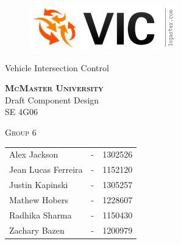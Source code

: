 \documentclass [10pt]{article}
\begin{document}
\begin {center} 

\thispagestyle{empty}
\vspace*{5cm}

\begin {figure}[h!]
\centering
\hspace{-10mm}\includegraphics [scale = .5, trim={.4cm 0 .8cm 0},clip] {figures/vic_logo.png}
\end {figure}

{\fontfamily{\cabinfamily}\selectfont
\Huge{Vehicle Intersection Control} }

\vspace{1 cm}
{\Large\textbf{\textsc{McMaster University}}\\}  \vspace {1cm}
{\Large Draft Component Design\\ \vspace {0.4 cm} SE 4G06}  \vspace {1cm}

{\large \textsc{Group 6} \\} \vspace{1cm}

\begin{tabular}{ l c  l}
Alex Jackson &-& 1302526\\
Jean Lucas Ferreira &-& 1152120 \\
Justin Kapinski &-& 1305257\\
Mathew Hobers &-& 1228607\\
Radhika Sharma &-& 1150430\\
Zachary Bazen &-& 1200979
\end{tabular}




\end{center}


\pagebreak


\tableofcontents
\listoftables
\listoffigures



\pagebreak


\thispagestyle{plain}
\end{document}
